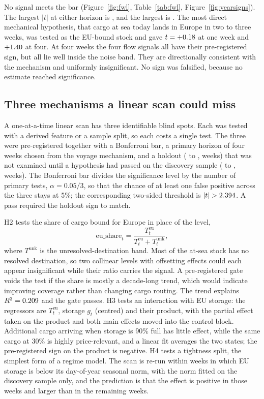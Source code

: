 No signal meets the bar (Figure~\ref{fig:fwl}, Table~\ref{tab:fwl},
Figure~\ref{fig:yearsigns}). The largest $|t|$ at either horizon is \bMaxTCov, and
the largest \pRsq{} is \bMaxRsqCov. The most direct mechanical hypothesis, that
cargo at sea today lands in Europe in two to three weeks, was tested as the
EU-bound stock and gave $t=+0.18$ at one week and $+1.40$ at
four. At four weeks the four flow signals all have their pre-registered sign, but
all lie well inside the noise band. They are directionally consistent with the
mechanism and uniformly insignificant. No sign was falsified, because no estimate
reached significance.

\subsection{Three mechanisms a linear scan could miss}\label{sec:mechanisms}

A one-at-a-time linear scan has three identifiable blind spots. Each was tested with
a derived feature or a sample split, so each costs a single test. The three were
pre-registered together with a Bonferroni bar, a primary horizon of four weeks
chosen from the voyage mechanism, and a holdout (\mechHoldLoCov{} to
\mechHoldHiCov, \mechHoldNCov{} weeks) that was not examined until a hypothesis had
passed on the discovery sample (\mechDiscLoCov{} to \mechDiscHiCov, \mechDiscNCov{}
weeks). The Bonferroni bar divides the significance level by the number of primary
tests, $\alpha = 0.05/3$, so that the chance of at least one false positive across
the three stays at 5\%; the corresponding two-sided threshold is
$|t| > 2.394$. A pass required the holdout sign to match.

H2 tests the share of cargo bound for Europe in place of the level,
\begin{equation}
  \text{eu\_share}_t = \frac{T^{\mathrm{eu}}_t}{T^{\mathrm{eu}}_t + T^{\mathrm{unk}}_t},
  \label{eq:h2}
\end{equation}
where $T^{\mathrm{unk}}$ is the unresolved-destination band. Most of the at-sea
stock has no resolved destination, so two collinear levels with offsetting effects
could each appear insignificant while their ratio carries the signal. A
pre-registered gate voids the test if the share is mostly a decade-long trend, which
would indicate improving coverage rather than changing cargo routing. The trend
explains $R^2=0.209$ and the gate passes. H3 tests an interaction with
EU storage: the regressors are $T^{\mathrm{eu}}_t$, storage $g_t$ (centred) and
their product, with the partial effect taken on the product and both main effects
moved into the control block. Additional cargo arriving when storage is 90\% full
has little effect, while the same cargo at 30\% is highly price-relevant, and a
linear fit averages the two states; the pre-registered sign on the product is
negative. H4 tests a tightness split, the simplest form of a regime model. The scan
is re-run within weeks in which EU storage is below its day-of-year seasonal norm,
with the norm fitted on the discovery sample only, and the prediction is that the
effect is positive in those weeks and larger than in the remaining weeks.

